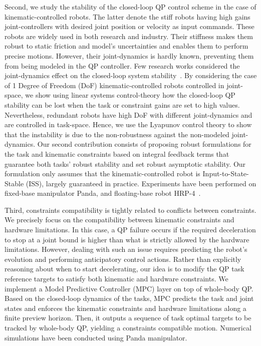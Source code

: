 Second, we study the stability of the closed-loop QP control scheme in the case of kinematic-controlled robots. The latter denote the stiff robots having high gains joint-controllers with desired joint position or velocity as input commands. These robots are widely used in both research and industry. Their stiffness makes them robust to static friction and model's uncertainties and enables them to perform precise motions. However, their joint-dynamics is hardly known, preventing them from being modeled in the QP controller. Few research works considered the joint-dynamics effect on the closed-loop system stability~\cite{singletary2022csl,molnar2022ral}.  
By considering the case of 1 Degree of Freedom (DoF) kinematic-controlled robots controlled in joint-space, we show using linear systems control-theory how the closed-loop QP stability can be lost when the task or constraint gains are set to high values. Nevertheless, redundant robots have high DoF with different joint-dynamics and are controlled in task-space. Hence, we use the Lyapunov control theory to show that the instability is due to the non-robustness against the non-modeled joint-dynamics. Our second contribution consists of proposing robust formulations for the task and kinematic constraints based on integral feedback terms that guarantee both tasks' robust stability and set robust asymptotic stability. Our formulation only assumes that the kinematic-controlled robot is Input-to-State-Stable (ISS), largely guaranteed in practice. Experiments have been performed on fixed-base manipulator Panda, and floating-base robot HRP-4~\cite{djeha2022tro-submitted}.  

Third, constraints compatibility is tightly related to conflicts between constraints. We precisely focus on the compatibility between kinematic constraints and hardware limitations. In this case, a QP failure occurs if the required deceleration to stop at a joint bound is higher than what is strictly allowed by the hardware limitations. However, dealing with such an issue requires predicting the robot's evolution and performing anticipatory control actions. Rather than explicitly reasoning about when to start decelerating, our idea is to modify the QP task reference targets to satisfy both kinematic and hardware constraints. We implement a Model Predictive Controller (MPC) layer on top of whole-body QP. Based on the closed-loop dynamics of the tasks, MPC predicts the task and joint states and enforces the kinematic constraints and hardware limitations along a finite preview horizon. Then, it outputs a sequence of task optimal targets to be tracked by whole-body QP, yielding a constraints compatible motion. Numerical simulations have been conducted using Panda manipulator.

